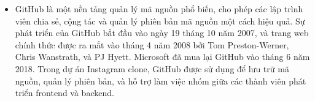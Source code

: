 \begin{itemize}
\item GitHub là một nền tảng quản lý mã nguồn phổ biến, cho phép các lập trình viên chia sẻ, cộng tác và quản lý phiên bản mã nguồn một cách hiệu quả. Sự phát triển của GitHub bắt đầu vào ngày 19 tháng 10 năm 2007, và trang web chính thức được ra mắt vào tháng 4 năm 2008 bởi Tom Preston-Werner, Chris Wanstrath, và PJ Hyett. Microsoft đã mua lại GitHub vào tháng 6 năm 2018. Trong dự án Instagram clone, GitHub được sử dụng để lưu trữ mã nguồn, quản lý phiên bản, và hỗ trợ làm việc nhóm giữa các thành viên phát triển frontend và backend.
\end{itemize}

